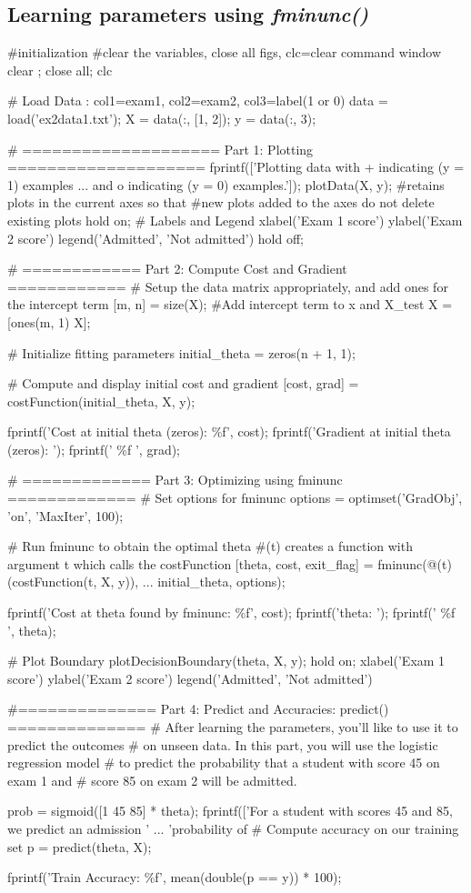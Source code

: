 \documentclass[a4paper,12pt]{report}
\begin{document}
\subsection{Learning parameters using \textit{fminunc()}}
\begin{python}
#initialization
#clear the variables, close all figs, clc=clear command window
clear ; close all; clc 

# Load Data : col1=exam1, col2=exam2, col3=label(1 or 0)
data = load('ex2data1.txt');
X = data(:, [1, 2]); y = data(:, 3);

# ==================== Part 1: Plotting ====================
fprintf(['Plotting data with + indicating (y = 1) examples ...
and o indicating (y = 0) examples.\n']);
plotData(X, y);
#retains plots in the current axes so that 
#new plots added to the axes do not delete existing plots
hold on; 
# Labels and Legend
xlabel('Exam 1 score')
ylabel('Exam 2 score')
legend('Admitted', 'Not admitted')
hold off;

# ============ Part 2: Compute Cost and Gradient ============
# Setup the data matrix appropriately, and add ones for the intercept term
[m, n] = size(X);
#Add intercept term to x and X_test
X = [ones(m, 1) X];

# Initialize fitting parameters
initial_theta = zeros(n + 1, 1);

# Compute and display initial cost and gradient
[cost, grad] = costFunction(initial_theta, X, y);

fprintf('Cost at initial theta (zeros): \%f\n', cost);
fprintf('Gradient at initial theta (zeros): \n');
fprintf(' \%f \n', grad);

# ============= Part 3: Optimizing using fminunc  =============
#  Set options for fminunc
options = optimset('GradObj', 'on', 'MaxIter', 100);

# Run fminunc to obtain the optimal theta
#\@(t) creates a function with argument t which calls the costFunction
[theta, cost, exit_flag] = fminunc(@(t)(costFunction(t, X, y)), ...
initial\_theta, options);

fprintf('Cost at theta found by fminunc: \%f\n', cost);
fprintf('theta: \n');
fprintf(' \%f \n', theta);

# Plot Boundary
plotDecisionBoundary(theta, X, y);
hold on;
xlabel('Exam 1 score')
ylabel('Exam 2 score')
legend('Admitted', 'Not admitted')

#============== Part 4: Predict and Accuracies: predict() ==============
#  After learning the parameters, you'll like to use it to predict the outcomes
#  on unseen data. In this part, you will use the logistic regression model
#  to predict the probability that a student with score 45 on exam 1 and 
#  score 85 on exam 2 will be admitted.

prob = sigmoid([1 45 85] * theta);
fprintf(['For a student with scores 45 and 85, we predict an admission ' ...
         'probability of %
# Compute accuracy on our training set
p = predict(theta, X);

fprintf('Train Accuracy: \%f\n', mean(double(p == y)) * 100);

\end{python}
\end{document}
